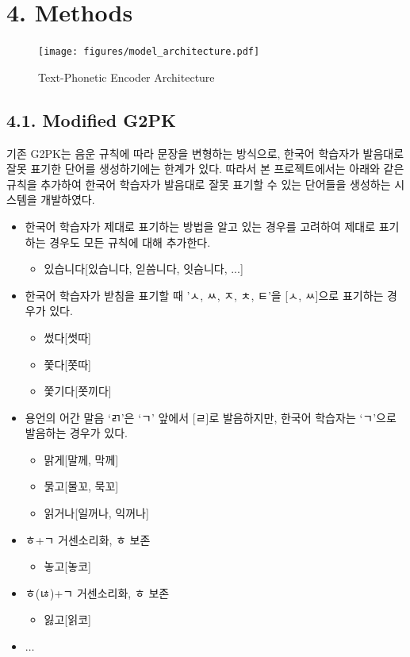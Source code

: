 \documentclass[letterpaper]{article} %
\begin{document}
\section{4. Methods}

\begin{figure}[ht]
    \centering
    \texttt{[image: figures/model\_architecture.pdf]}
    \caption{Text-Phonetic Encoder Architecture}
    \label{fig:phonetic_encoder}
\end{figure}

\subsection{4.1. Modified G2PK}
기존 G2PK는 음운 규칙에 따라 문장을 변형하는 방식으로, 한국어 학습자가 발음대로 잘못 표기한 단어를 생성하기에는 한계가 있다.
따라서 본 프로젝트에서는 아래와 같은 규칙을 추가하여 한국어 학습자가 발음대로 잘못 표기할 수 있는 단어들을 생성하는 시스템을 개발하였다.
\begin{itemize}
    \item 한국어 학습자가 제대로 표기하는 방법을 알고 있는 경우를 고려하여 제대로 표기하는 경우도 모든 규칙에 대해 추가한다.
          \begin{itemize}
              \item 있습니다[있습니다, 읻씀니다, 잇슴니다, ...]
          \end{itemize}
    \item 한국어 학습자가 받침을 표기할 때 'ㅅ, ㅆ, ㅈ, ㅊ, ㅌ'을 [ㅅ, ㅆ]으로 표기하는 경우가 있다.
          \begin{itemize}
              \item 썼다[썻따]
              \item 쫓다[쫏따]
              \item 쫓기다[쫏끼다]
          \end{itemize}
    \item 용언의 어간 말음 `ㄺ'은 `ㄱ' 앞에서 [ㄹ]로 발음하지만, 한국어 학습자는 `ㄱ'으로 발음하는 경우가 있다.
          \begin{itemize}
              \item 맑게[말께, 막께]
              \item 묽고[물꼬, 묵꼬]
              \item 읽거나[일꺼나, 익꺼나]
          \end{itemize}
    \item ㅎ+ㄱ 거센소리화, ㅎ 보존
          \begin{itemize}
            \item 놓고[놓코]
          \end{itemize}
    \item ㅎ(ㄶ)+ㄱ 거센소리화, ㅎ 보존
            \begin{itemize}
                \item 잃고[읽코]
            \end{itemize}
    \item $\dots$
\end{itemize}
\end{document}
